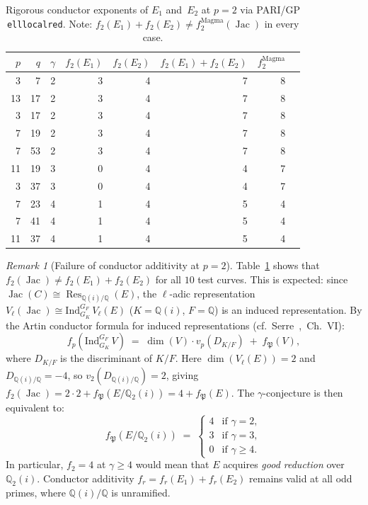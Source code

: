 \documentclass[11pt,a4paper]{article}
\newcommand{\Jac}{\operatorname{Jac}}
\newcommand{\Res}{\operatorname{Res}}
\theoremstyle{definition}
\theoremstyle{remark}
\newtheorem{remark}[theorem]{Remark}
\begin{document}
\begin{table}[H]
\centering
\begin{tabular}{rrrrrrrr}
\toprule
$p$ & $q$ & $\gamma$ & $f_2(E_1)$ & $f_2(E_2)$
& $f_2(E_1){+}f_2(E_2)$ & $f_2^{\mathrm{Magma}}$ \\
\midrule
 3 &  7 & 2 & 3 & 4 & 7 & 8 \\
13 & 17 & 2 & 3 & 4 & 7 & 8 \\
 3 & 17 & 2 & 3 & 4 & 7 & 8 \\
 7 & 19 & 2 & 3 & 4 & 7 & 8 \\
 7 & 53 & 2 & 3 & 4 & 7 & 8 \\
11 & 19 & 3 & 0 & 4 & 4 & 7 \\
 3 & 37 & 3 & 0 & 4 & 4 & 7 \\
 7 & 23 & 4 & 1 & 4 & 5 & 4 \\
 7 & 41 & 4 & 1 & 4 & 5 & 4 \\
11 & 37 & 4 & 1 & 4 & 5 & 4 \\
\bottomrule
\end{tabular}
\caption{Rigorous conductor exponents of $E_1$ and~$E_2$
  at $p = 2$ via PARI/GP \texttt{elllocalred}.
  Note: $f_2(E_1) + f_2(E_2) \ne f_2^{\mathrm{Magma}}(\Jac)$
  in every case.}
\label{tab:pari}
\end{table}

\begin{remark}[Failure of conductor additivity at $p = 2$]
\label{rem:nonadd}
  Table~\ref{tab:pari} shows that
  $f_2(\Jac) \ne f_2(E_1) + f_2(E_2)$ for all $10$ test
  curves.  This is expected: since
  $\Jac(C) \cong \Res_{\mathbb{Q}(i)/\mathbb{Q}}(E)$,
  the $\ell$-adic representation
  $V_\ell(\Jac) \cong \mathrm{Ind}_{G_K}^{G_F}\,V_\ell(E)$
  ($K = \mathbb{Q}(i)$, $F = \mathbb{Q}$) is an induced
  representation.  By the Artin conductor formula
  for induced representations
  (cf.\ Serre~\cite{Serre1979},~Ch.~VI):
  \begin{equation}\label{eq:cdf}
    f_p(\mathrm{Ind}_{G_K}^{G_F}\,V)
    \;=\; \dim(V) \cdot v_p(D_{K/F})
    \;+\; f_{\mathfrak{P}}(V),
  \end{equation}
  where $D_{K/F}$ is the discriminant of $K/F$.
  Here $\dim(V_\ell(E)) = 2$ and $D_{\mathbb{Q}(i)/\mathbb{Q}} = -4$,
  so $v_2(D_{\mathbb{Q}(i)/\mathbb{Q}}) = 2$, giving
  $f_2(\Jac) = 2 \cdot 2 + f_{\mathfrak{P}}(E/\mathbb{Q}_2(i))
  = 4 + f_{\mathfrak{P}}(E)$.
  The $\gamma$-conjecture is then equivalent to:
  \[
    f_{\mathfrak{P}}(E/\mathbb{Q}_2(i))
    \;=\; \begin{cases}
      4 & \text{if } \gamma = 2, \\
      3 & \text{if } \gamma = 3, \\
      0 & \text{if } \gamma \ge 4.
    \end{cases}
  \]
  In particular, $f_2 = 4$ at $\gamma \ge 4$ would mean
  that $E$ acquires \emph{good reduction} over
  $\mathbb{Q}_2(i)$.
  Conductor additivity $f_r = f_r(E_1) + f_r(E_2)$
  remains valid at all odd primes, where
  $\mathbb{Q}(i)/\mathbb{Q}$ is unramified.
\end{remark}
\end{document}
